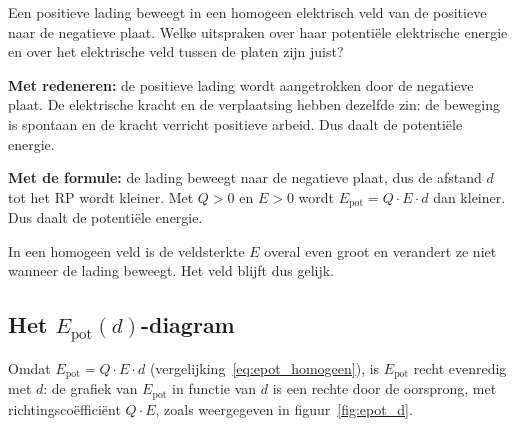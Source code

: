 \documentclass{ximera}
\begin{document}
\begin{question}
    Een positieve lading beweegt in een homogeen elektrisch veld van de positieve naar de negatieve plaat. Welke uitspraken over haar potentiële elektrische energie en over het elektrische veld tussen de platen zijn juist?

    \begin{selectAll}
    \end{selectAll}

    \begin{solution}\nl
        \textbf{Met redeneren:} de positieve lading wordt aangetrokken door de negatieve plaat. De elektrische kracht en de verplaatsing hebben dezelfde zin: de beweging is spontaan en de kracht verricht positieve arbeid. Dus daalt de potentiële energie.

        \textbf{Met de formule:} de lading beweegt naar de negatieve plaat, dus de afstand $d$ tot het RP wordt kleiner. Met $Q>0$ en $E>0$ wordt $E_{\text{pot}} = Q \cdot E \cdot d$ dan kleiner. Dus daalt de potentiële energie.

        In een homogeen veld is de veldsterkte $E$ overal even groot en verandert ze niet wanneer de lading beweegt. Het veld blijft dus gelijk.
    \end{solution}
\end{question}

\subsection{Het $E_{\text{pot}}(d)$-diagram}
Omdat $E_{\text{pot}} = Q \cdot E \cdot d$ (vergelijking~\ref{eq:epot_homogeen}), is $E_{\text{pot}}$ recht evenredig met $d$: de grafiek van $E_{\text{pot}}$ in functie van $d$ is een rechte door de oorsprong, met richtingscoëfficiënt $Q \cdot E$, zoals weergegeven in figuur~\ref{fig:epot_d}.
\end{document}
